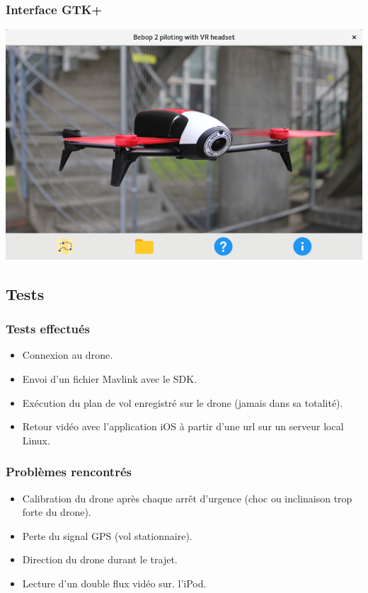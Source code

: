 \documentclass{beamer}
\begin{document}
	
	
	\begin{frame}
		\frametitle{Interface GTK+}
		\includegraphics[scale=0.4]{Architecture_logicielle_composants/GUI-v2.png}	
	
	\end{frame}
	
	
	\begin{frame}
		\section{Tests}
		\begin{center}
		\frametitle{Tests effectués}
           	\begin{itemize}
                \item Connexion au drone.
                \item Envoi d'un fichier Mavlink avec le SDK.
                \item Exécution du plan de vol enregistré sur le drone (jamais dans sa totalité).
                \item Retour vidéo avec l'application iOS à partir d'une url sur un serveur local Linux.
            \end{itemize}
		\end{center}
	\end{frame}
	
	
	
	\begin{frame}
		\begin{center}
		\frametitle{Problèmes rencontrés}
             \begin{itemize}
                \item Calibration du drone après chaque arrêt d'urgence (choc ou inclinaison trop forte du drone).
                \item Perte du signal GPS (vol stationnaire).
                \item Direction du drone durant le trajet.
                \item Lecture d'un double flux vidéo sur. l'iPod.
            \end{itemize}
		\end{center}
	\end{frame}
	
	
\end{document}
